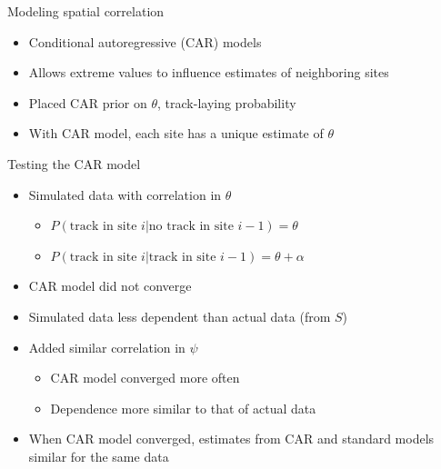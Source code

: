 \documentclass{beamer}
\begin{document}
\begin{frame}{Modeling spatial correlation}
	\begin{itemize}
		\item Conditional autoregressive (CAR) models
		\item Allows extreme values to influence estimates of neighboring sites
		\item Placed CAR prior on $\theta$, track-laying probability
		\item With CAR model, each site has a unique estimate of $\theta$
	\end{itemize}
\end{frame}


\begin{frame}{Testing the CAR model}
	\begin{itemize}
		\item Simulated data with correlation in $\theta$
		\begin{itemize}
			\item $P(\text{track in site }i|\text{no track in site }i-1)=\theta$
			\item $P(\text{track in site }i|\text{track in site }i-1)=\theta+
			\alpha$
		\end{itemize}
		\item CAR model did not converge
		\item Simulated data less dependent than actual data (from $S$)
		\item Added similar correlation in $\psi$
		\begin{itemize}
			\item CAR model converged more often
			\item Dependence more similar to that of actual data
		\end{itemize}
		\item When CAR model converged, estimates from CAR and standard models
		similar for the same data
	\end{itemize}
\end{frame}
\end{document}
